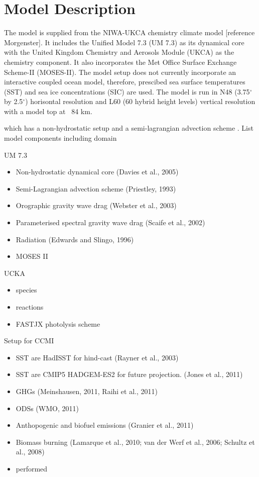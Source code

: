 \section{Model Description}

The model is supplied from the NIWA-UKCA chemistry climate model [reference Morgenster]. It includes the Unified Model 7.3 (UM 7.3) as its dynamical core with the United Kingdom Chemistry and Aerosols Module (UKCA) as the chemistry component. It also incorporates the Met Office Surface Exchange Scheme-II (MOSES-II). The model setup does not currently incorporate an interactive coupled ocean model, therefore, prescibed sea surface temperatures (SST) and sea ice concentrations (SIC) are used. The model is run in N48 (3.75$^\circ$ by 2.5$^\circ$) horisontal resolution and L60 (60 hybrid height levels) vertical resolution with a model top at ~84 km.

which has a non-hydrostatic setup \citep{Davies:2005vu} and a semi-lagrangian advection scheme \citep{Priestley:1993ur}.
List model components including domain

UM 7.3
\begin{itemize}
\item Non-hydrostatic dynamical core (Davies et al., 2005)
\item Semi-Lagrangian advection scheme (Priestley, 1993)
\item Orographic gravity wave drag (Webster et al., 2003)
\item Parameterised spectral gravity wave drag (Scaife et al., 2002)
\item Radiation (Edwards and Slingo, 1996)
\item MOSES II
\end{itemize}
UCKA
\begin{itemize}
\item species
\item reactions
\item FASTJX photolysis scheme
\end{itemize}
Setup for CCMI
\begin{itemize}
\item SST are HadISST for hind-cast (Rayner et al., 2003)
\item SST are CMIP5 HADGEM-ES2 for future projection. (Jones et al., 2011)
\item GHGs (Meinshausen, 2011, Raihi et al., 2011)
\item ODSs (WMO, 2011)
\item Anthopogenic and biofuel emissions (Granier et al., 2011)
\item Biomass burning (Lamarque et al., 2010; van der Werf et al., 2006; Schultz et al., 2008)
\item performed
\end{itemize}


